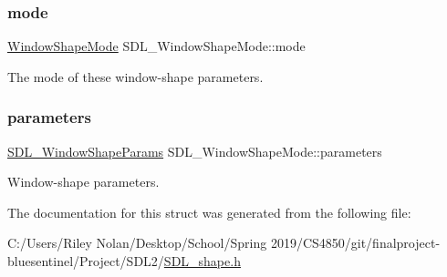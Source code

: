 \subsubsection{\texorpdfstring{mode}{mode}}
{\footnotesize\ttfamily \mbox{\hyperlink{_s_d_l__shape_8h_aa30948f2699e316a43b740eccebe5c20}{Window\+Shape\+Mode}} S\+D\+L\+\_\+\+Window\+Shape\+Mode\+::mode}



The mode of these window-\/shape parameters. 

\mbox{\label{struct_s_d_l___window_shape_mode_a2f79bb294034156207fa6d88d3a8c819}} 
\subsubsection{\texorpdfstring{parameters}{parameters}}
{\footnotesize\ttfamily \mbox{\hyperlink{union_s_d_l___window_shape_params}{S\+D\+L\+\_\+\+Window\+Shape\+Params}} S\+D\+L\+\_\+\+Window\+Shape\+Mode\+::parameters}



Window-\/shape parameters. 



The documentation for this struct was generated from the following file\+:\begin{DoxyCompactItemize}
\item 
C\+:/\+Users/\+Riley Nolan/\+Desktop/\+School/\+Spring 2019/\+C\+S4850/git/finalproject-\/bluesentinel/\+Project/\+S\+D\+L2/\mbox{\hyperlink{_s_d_l__shape_8h}{S\+D\+L\+\_\+shape.\+h}}\end{DoxyCompactItemize}
